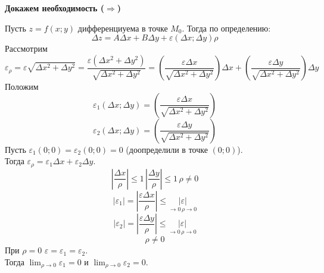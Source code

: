 \documentclass[12pt]{article}
\begin{document}
    \begin{adjustwidth}{1.5em}{1.5em}
        \textbf{Докажем необходимость ($\Rightarrow$)}\par\noindent
        Пусть $z = f(x; y)$ дифференциуема в точке $M_0$. Тогда по определению:
        \[ \Delta z = A \Delta x + B \Delta y + \varepsilon (\Delta x; \Delta y)\rho \]
        Рассмотрим 
        \[ \varepsilon_\rho = \varepsilon \sqrt{\Delta x^2 + \Delta y^2} = \frac{\varepsilon (\Delta x^2 + \Delta y^2)}{\sqrt{\Delta x^2 + \Delta y^2}} = \left( \frac{\varepsilon \Delta x}{\sqrt{\Delta x^2 + \Delta y^2}} \right)\Delta x + \left( \frac{\varepsilon \Delta y}{\sqrt{\Delta x^2 + \Delta y^2}} \right)\Delta y \]
        Положим
        \[ \varepsilon_1 (\Delta x; \Delta y) = \left( \frac{\varepsilon \Delta x}{\sqrt{\Delta x^2 + \Delta y^2}} \right) \]
        \[ \varepsilon_2 (\Delta x; \Delta y) = \left( \frac{\varepsilon \Delta y}{\sqrt{\Delta x^2 + \Delta y^2}} \right) \]
        Пусть $\varepsilon_1 (0; 0) = \varepsilon_2 (0; 0) = 0$ (доопределили в точке $(0; 0)$).\\
        Тогда $\varepsilon_\rho = \varepsilon_1 \Delta x + \varepsilon_2 \Delta y$.
        \[ \left| \frac{\Delta x}{\rho} \right| \le 1\, \left| \frac{\Delta y}{\rho} \right| \le 1\, \rho \ne 0 \]
        \[ | \varepsilon_1 | = \left| \frac{\varepsilon \Delta x}{\rho} \right| \le \underset{\to 0\, \rho \to 0}{|\varepsilon|} \]
        \[ | \varepsilon_2 | = \left| \frac{\varepsilon \Delta y}{\rho} \right| \le \underset{\to 0\, \rho \to 0}{|\varepsilon|} \]
        \[ \rho \ne 0 \]
        При $\rho = 0$ $\varepsilon = \varepsilon_1 = \varepsilon_2$.\\
        Тогда $\lim_{\rho \to 0}\varepsilon_1 = 0$ и $\lim_{\rho \to 0}\varepsilon_2 = 0$.\par\noindent


\end{adjustwidth}
\end{document}
